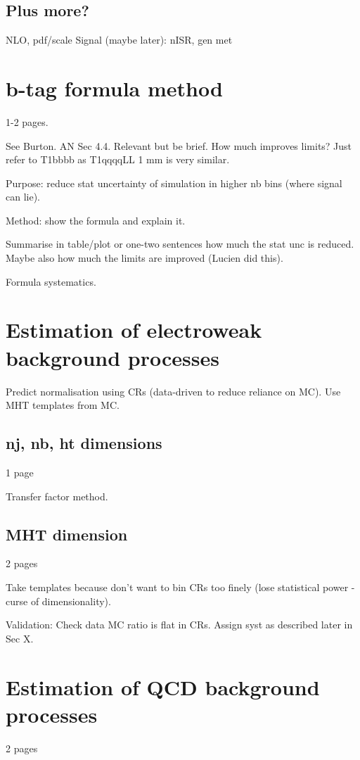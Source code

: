 \subsection{Plus more?}
NLO, pdf/scale
Signal (maybe later): nISR, gen met

\section{b-tag formula method}
1-2 pages.

See Burton. AN Sec 4.4.
Relevant but be brief.
How much improves limits? Just refer to T1bbbb as T1qqqqLL 1 mm is very similar.

Purpose: reduce stat uncertainty of simulation in higher nb bins (where signal 
can lie).

Method: show the formula and explain it.

Summarise in table/plot or one-two sentences how much the stat unc is reduced. 
Maybe also how much the limits are improved (Lucien did this).

Formula systematics.

\section{Estimation of electroweak background processes}
Predict normalisation using CRs (data-driven to reduce reliance on MC). Use MHT 
templates from MC.

\subsection{nj, nb, ht dimensions}
1 page

Transfer factor method.

\subsection{MHT dimension}
2 pages

Take templates because don't want to bin CRs too finely (lose statistical power 
- curse of dimensionality).

Validation: Check data MC ratio is flat in CRs. Assign syst as described later 
in Sec X.

\section{Estimation of QCD background processes}
2 pages

